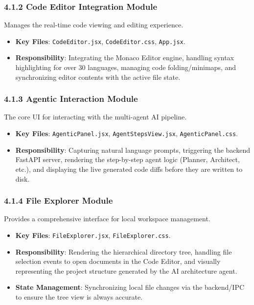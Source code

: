 \documentclass[
  12pt,
]{article}
\providecommand{\tightlist}{%
  \setlength{\itemsep}{0pt}\setlength{\parskip}{0pt}}
\begin{document}
\subsubsection{4.1.2 Code Editor Integration
Module}\label{code-editor-integration-module}

Manages the real-time code viewing and editing experience.

\begin{itemize}
\tightlist
\item
  \textbf{Key Files}: \texttt{CodeEditor.jsx}, \texttt{CodeEditor.css},
  \texttt{App.jsx}.
\item
  \textbf{Responsibility}: Integrating the Monaco Editor engine,
  handling syntax highlighting for over 30 languages, managing code
  folding/minimaps, and synchronizing editor contents with the active
  file state.
\end{itemize}

\subsubsection{4.1.3 Agentic Interaction
Module}\label{agentic-interaction-module}

The core UI for interacting with the multi-agent AI pipeline.

\begin{itemize}
\tightlist
\item
  \textbf{Key Files}: \texttt{AgenticPanel.jsx},
  \texttt{AgentStepsView.jsx}, \texttt{AgenticPanel.css}.
\item
  \textbf{Responsibility}: Capturing natural language prompts,
  triggering the backend FastAPI server, rendering the step-by-step
  agent logic (Planner, Architect, etc.), and displaying the live
  generated code diffs before they are written to disk.
\end{itemize}

\subsubsection{4.1.4 File Explorer Module}\label{file-explorer-module}

Provides a comprehensive interface for local workspace management.

\begin{itemize}
\tightlist
\item
  \textbf{Key Files}: \texttt{FileExplorer.jsx},
  \texttt{FileExplorer.css}.
\item
  \textbf{Responsibility}: Rendering the hierarchical directory tree,
  handling file selection events to open documents in the Code Editor,
  and visually representing the project structure generated by the AI
  architecture agent.
\item
  \textbf{State Management}: Synchronizing local file changes via the
  backend/IPC to ensure the tree view is always accurate.
\end{itemize}
\end{document}
